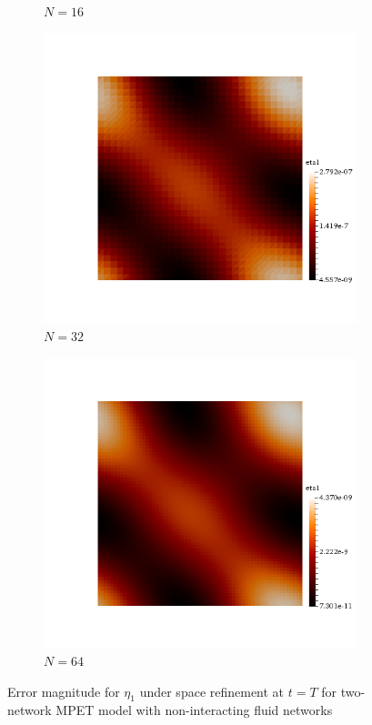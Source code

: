 \begin{figure}[h!]
\begin{subfigure}[b]{0.24\textwidth}
    \caption{$N=16$}
  \end{subfigure}
  \begin{subfigure}[b]{0.24\textwidth}
    \includegraphics[width=\textwidth,height=\textheight,keepaspectratio,height=\textheight,keepaspectratio]{figures/2_mpet/no_transfer/space/eta1_32.png}
    \caption{$N=32$}
  \end{subfigure}
  \begin{subfigure}[b]{0.24\textwidth}
    \includegraphics[width=\textwidth,height=\textheight,keepaspectratio,height=\textheight,keepaspectratio]{figures/2_mpet/no_transfer/space/eta1_64.png}
    \caption{$N=64$}
  \end{subfigure}
  \caption{Error magnitude for $\eta_1$ under space refinement at $t=T$ for two-network MPET model with non-interacting fluid networks} \label{fig:bb_no_transfer_eta1}
\end{figure}
